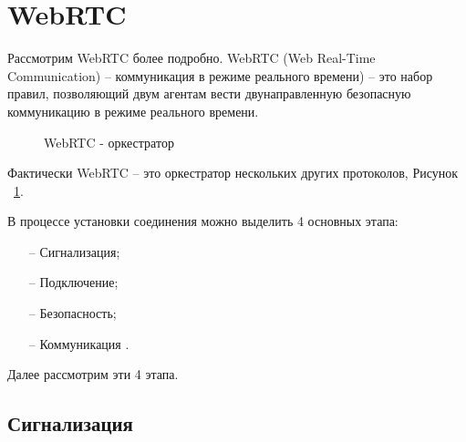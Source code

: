 \section{WebRTC}

Рассмотрим WebRTC более подробно. WebRTC (Web Real-Time \\ Communication) -- коммуникация в режиме реального времени) -- это набор правил, позволяющий двум агентам вести двунаправленную безопасную коммуникацию в режиме реального времени.

\begin{figure}[ht]
\begin{center}

\caption{
\label{webrtc-orchestrator}
     WebRTC - оркестратор}
\end {center}
\end {figure}

Фактически WebRTC -- это оркестратор нескольких других протоколов, Рисунок ~\ref{webrtc-orchestrator}.

В процессе установки соединения можно выделить 4 основных этапа:
\begin{itemize}
	\item[--] Сигнализация;
	\item[--] Подключение;
        \item[--] Безопасность;
        \item[--] Коммуникация \cite{v3}.
\end{itemize}

Далее рассмотрим эти 4 этапа.

\subsection{Сигнализация}

